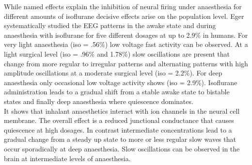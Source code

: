 While named effects explain the inhibition of neural firing under anaesthesia for different amounts of isoflurane decisive effects arise on the population level. Eger \parencite*{eger1981isoflurane} systematically studied the EEG patterns in the awake state and during anaesthesia with isoflurane for five different dosages at up to 2.9\% in humans. For very light anaesthesia (iso = .56\%) low voltage fast activity can be observed. At a light surgical level (iso = .96\% and 1.78\%) slow oscillations are present that change from more regular to irregular patterns and alternating patterns with high amplitude oscillations at a moderate surgical level (iso = 2.2\%). For deep anaesthesia only occasional low voltage activity shows (iso = 2.9\%). Isoflurane administration leads to a gradual shift from a stable awake state to bistable states and finally deep anaesthesia where quiescence dominates.\\
It shows that inhalant anaesthetics interact with ion channels in the neural cell membrane. The overall effect is a reduced junctional conductance that causes quiescence at high dosages. In contrast intermediate concentrations lead to a gradual change from a steady up state to more or less regular slow waves that occur sporadically at deep anaesthesia. Slow oscillations can be observed in the brain at intermediate levels of anaesthesia.
